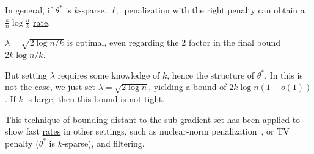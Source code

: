 \begin{note}
	In general, if \(\theta ^{\ast} \) is \(k\)-sparse, \(\ell _1\) penalization with the right penalty can obtain a \(\frac{k}{n} \log \frac{n}{k}\) \hyperref[def:rate-of-convergence]{rate}.
\end{note}

\begin{remark}
	\(\lambda = \sqrt{2 \log n / k} \) is optimal, even regarding the \(2\) factor in the final bound \(2k \log n / k\).
\end{remark}

But setting \(\lambda \) requires some knowledge of \(k\), hence the structure of \(\theta ^{\ast} \). In this is not the case, we just set \(\lambda = \sqrt{2 \log n} \), yielding a bound of \(2 k \log n (1 + o(1))\). If \(k\) is large, then this bound is not tight.

\begin{note}
	This technique of bounding distant to the \hyperref[def:sub-gradient]{sub-gradient set} has been applied to show fast \hyperref[def:rate-of-convergence]{rates} in other settings, such as nuclear-norm penalization~\cite{oymak2010new}, or TV penalty (\(\theta ^{\ast} \) is \(k\)-sparse), and filtering.
\end{note}